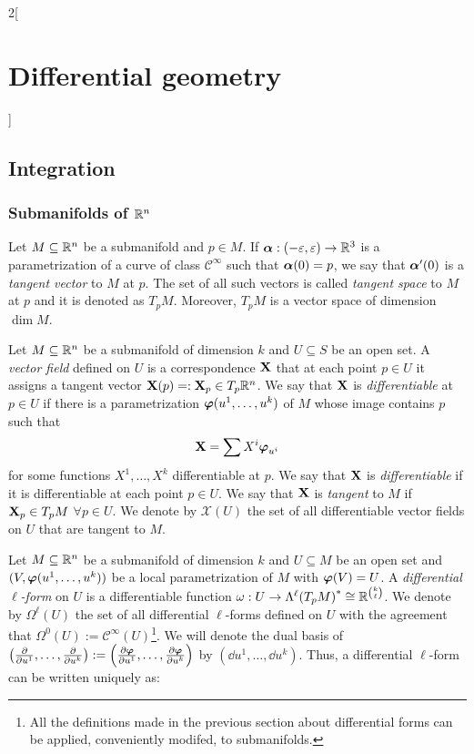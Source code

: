 \documentclass[../../../main.tex]{subfiles}
\begin{document}
\begin{multicols}{2}[\section{Differential geometry}]
  \subsection{Integration}
  \subsubsection{Submanifolds of \texorpdfstring{$\mathbb{R}^n$}{Rn}}
  \begin{definition}
    Let $M\subseteq\mathbb{R}^n$ be a submanifold and $p\in M$. If $\boldsymbol{\mathrm{\alpha}}:(-\varepsilon,\varepsilon)\rightarrow\mathbb{R}^3$ is a parametrization of a curve of class $\mathcal{C}^\infty$ such that $\boldsymbol{\mathrm{\alpha}}(0)=p$, we say that $\boldsymbol{\mathrm{\alpha}}'(0)$ is a \emph{tangent vector} to $M$ at $p$. The set of all such vectors is called \emph{tangent space} to $M$ at $p$ and it is denoted as $T_pM$. Moreover, $T_pM$ is a vector space of dimension $\dim M$.
  \end{definition}
  \begin{definition}
    Let $M\subseteq\mathbb{R}^n$ be a submanifold of dimension $k$ and $U\subseteq S$ be an open set. A \emph{vector field} defined on $U$ is a correspondence $\boldsymbol{\mathrm{X}}$ that at each point $p\in U$ it assigns a tangent vector $\boldsymbol{\mathrm{X}}(p)=:\boldsymbol{\mathrm{X}}_p\in T_p\mathbb{R}^n$. We say that $\boldsymbol{\mathrm{X}}$ is \emph{differentiable} at $p\in U$ if there is a parametrization $\boldsymbol{\mathrm{\varphi}}(u^1,\ldots,u^k)$ of $M$ whose image contains $p$ such that $$\boldsymbol{\mathrm{X}}=\sum X^i\boldsymbol{\mathrm{\varphi}}_{u^i}$$ for some functions $X^1,\ldots,X^k$ differentiable at $p$. We say that $\boldsymbol{\mathrm{X}}$ is \emph{differentiable} if it is differentiable at each point $p\in U$. We say that $\boldsymbol{\mathrm{X}}$ is \emph{tangent} to $M$ if $\boldsymbol{\mathrm{X}}_p\in T_pM$ $\forall p\in U$. We denote by $\mathcal{X}(U)$ the set of all differentiable vector fields on $U$ that are tangent to $M$.
  \end{definition}
  \begin{definition}
    Let $M\subseteq\mathbb{R}^n$ be a submanifold of dimension $k$ and $U\subseteq M$ be an open set and $(V,\boldsymbol{\mathrm{\varphi}}(u^1,\ldots,u^k))$ be a local parametrization of $M$ with $\boldsymbol{\mathrm{\varphi}}(V)=U$. A \emph{differential $\ell$-form} on $U$ is a differentiable function $\omega:U\rightarrow\Lambda^\ell{(T_pM)}^*\cong\mathbb{R}^{\binom{k}{\ell}}$. We denote by $\Omega^\ell(U)$ the set of all differential $\ell$-forms defined on $U$ with the agreement that $\Omega^0(U):=\mathcal{C}^\infty(U)$\footnote{All the definitions made in the previous section about differential forms can be applied, conveniently modifed, to submanifolds.}. We will denote the dual basis of $\left(\pdv{}{u^1},\ldots,\pdv{}{u^k}\right):=\left(\pdv{\boldsymbol{\mathrm{\varphi}}}{u^1},\ldots,\pdv{\boldsymbol{\mathrm{\varphi}}}{u^k}\right)$ by $(\dd{u^1},\ldots,\dd{u^k})$. Thus, a differential $\ell$-form can be written uniquely as:

\end{definition}
\end{multicols}
\end{document}
